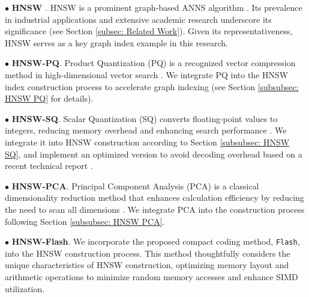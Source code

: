 \noindent$\bullet$ \textbf{HNSW} \cite{HNSW}. HNSW is a prominent graph-based ANNS algorithm \cite{graph_survey_vldb2021, DPG, ADSampling}. Its prevalence in industrial applications \cite{zhang2023vbase,PASE,ADBV} and extensive academic research \cite{LiZAH20,ZhangLW24,ZuoQZLD24} underscore its significance (see Section \ref{subsec: Related Work}). Given its representativeness, HNSW serves as a key graph index example in this research.

\noindent$\bullet$ \textbf{HNSW-PQ}. Product Quantization (PQ) is a recognized vector compression method in high-dimensional vector search \cite{PQ,OPQ,ScaNN}. We integrate PQ into the HNSW index construction process to accelerate graph indexing (see Section \ref{subsubsec: HNSW PQ} for details).

\noindent$\bullet$ \textbf{HNSW-SQ}. Scalar Quantization (SQ) converts floating-point values to integers, reducing memory overhead and enhancing search performance \cite{LVQ,LeanVec,qdrant-sq}. We integrate it into HNSW construction according to Section \ref{subsubsec: HNSW SQ}, and implement an optimized version to avoid decoding overhead based on a recent technical report \cite{qdrant-sq}.

\noindent$\bullet$ \textbf{HNSW-PCA}. Principal Component Analysis (PCA) is a classical dimensionality reduction method that enhances calculation efficiency by reducing the need to scan all dimensions \cite{ADSampling,yang2024bridging}. We integrate PCA into the construction process following Section \ref{subsubsec: HNSW PCA}.

\noindent$\bullet$ \textbf{HNSW-Flash}. We incorporate the proposed compact coding method, \texttt{Flash}, into the HNSW construction process. This method thoughtfully considers the unique characteristics of HNSW construction, optimizing memory layout and arithmetic operations to minimize random memory accesses and enhance SIMD utilization.

